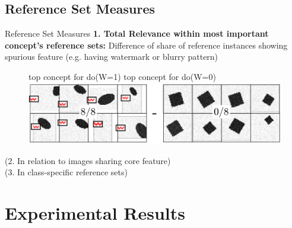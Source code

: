 \documentclass[German, aspectratio=169]{beamer}
\begin{document}
\subsection{Reference Set Measures}
\begin{frame}[t]{Reference Set Measures}
    \textbf{1. Total Relevance within most important concept's reference sets:}
    Difference of share of reference instances showing spurious feature
    (e.g. having watermark or blurry pattern)
    \vspace{-0.3cm}
    \begin{figure}[t!]
        \centering
        top concept for do(W=1) \hspace{3.3cm} top concept for do(W=0) \\
        \includegraphics[width=\textwidth]{images/reference_set_diff.png}
    \end{figure}
    \vspace{-0.2cm}
    (2. In relation to images sharing core feature)\\
    (3. In class-specific reference sets)

\end{frame}

\section[Experimental Results]{Experimental Results}
\end{document}
